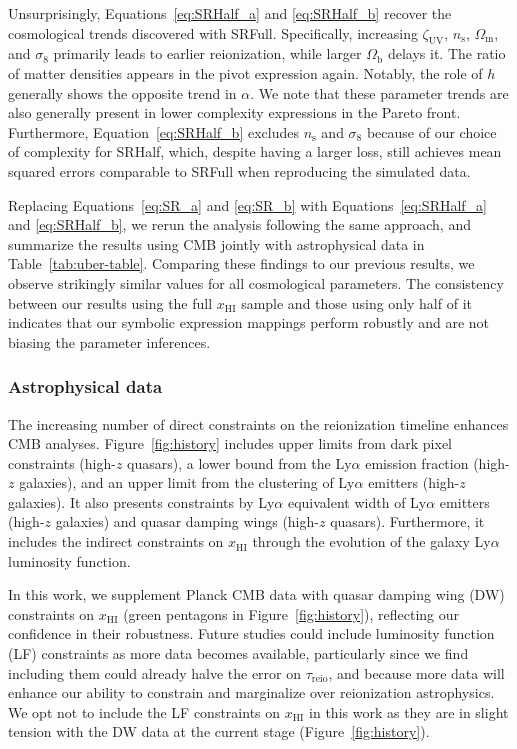 \documentclass[12pt]{article}
\newcommand{\ns}{n_\mathrm{s}}
\newcommand{\Omegam}{\Omega_\mathrm{m}}
\newcommand{\Omegab}{\Omega_\mathrm{b}}
\newcommand{\zetaUV}{\zeta_\mathrm{UV}}
\newcommand{\HI}{\mathrm{HI}}
\newcommand{\reio}{\mathrm{reio}}
\begin{document}
Unsurprisingly, Equations~\eqref{eq:SRHalf_a} and \eqref{eq:SRHalf_b} recover the cosmological
trends discovered with SRFull.
Specifically, increasing $\zetaUV$, $\ns$, $\Omegam$, and $\sigma_8$
primarily leads to earlier reionization, while larger $\Omegab$ delays
it.
The ratio of matter densities appears in the pivot expression again.
Notably, the role of $h$ generally shows the opposite trend in $\alpha$.
We note that these parameter trends are also generally present in lower
complexity expressions in the Pareto front.
Furthermore, Equation~\eqref{eq:SRHalf_b} excludes $\ns$ and $\sigma_8$ because of
our choice of complexity for SRHalf, which, despite having a larger
loss, still achieves mean squared errors comparable to SRFull when
reproducing the simulated data.

Replacing Equations~\eqref{eq:SR_a} and \eqref{eq:SR_b} with Equations~\eqref{eq:SRHalf_a} and \eqref{eq:SRHalf_b}, we
rerun the analysis following the same approach, and summarize the
results using CMB jointly with astrophysical data in
Table~\ref{tab:uber-table}.
Comparing these findings to our previous results, we observe strikingly
similar values for all cosmological parameters.
The consistency between our results using the full $x_\HI$ sample and
those using only half of it indicates that our symbolic expression
mappings perform robustly and are not biasing the parameter inferences.


\subsubsection*{Astrophysical data}
\label{sec:xHI}

The increasing number of direct constraints on the reionization timeline
enhances CMB analyses.
Figure~\ref{fig:history} includes upper limits from dark pixel
constraints\cite{Jin2023} (high-$z$ quasars), a lower bound from the
Ly$\alpha$ emission fraction\cite{Mesinger2015} (high-$z$ galaxies), and
an upper limit from the clustering of Ly$\alpha$
emitters\cite{Sobacchi2015} (high-$z$ galaxies).
It also presents constraints by Ly$\alpha$ equivalent width of
Ly$\alpha$ emitters\cite{Mason2018, Mason2019, Hoag2019} (high-$z$
galaxies) and quasar damping wings\cite{Greig2022, Greig2024, Spina2024,
Durovcikova2024} (high-$z$ quasars).
Furthermore, it includes the indirect constraints on $x_\HI$ through the
evolution of the galaxy Ly$\alpha$ luminosity
function\cite{Morales2021}.

In this work, we supplement Planck CMB data with quasar damping wing
(DW) constraints on $x_\HI$ (green pentagons in Figure~\ref{fig:history}),
reflecting our confidence in their robustness.
Future studies could include luminosity function (LF) constraints as
more data becomes available, particularly since we find including them
could already halve the error on $\tau_\reio$, and because more data
will enhance our ability to constrain and marginalize over reionization
astrophysics.
We opt not to include the LF constraints on $x_\HI$ in this work as they
are in slight tension with the DW data at the current stage
(Figure~\ref{fig:history}).
\end{document}
